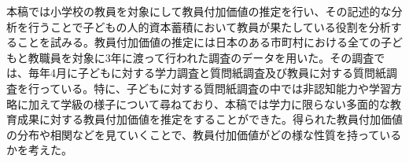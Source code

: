\documentclass[a4paper,12pt]{article}
\begin{document}
本稿では小学校の教員を対象にして教員付加価値の推定を行い、その記述的な分析を行うことで子どもの人的資本蓄積において教員が果たしている役割を分析することを試みる。教員付加価値の推定には日本のある市町村における全ての子どもと教職員を対象に3年に渡って行われた調査のデータを用いた。その調査では、毎年4月に子どもに対する学力調査と質問紙調査及び教員に対する質問紙調査を行っている。特に、子どもに対する質問紙調査の中では非認知能力や学習方略に加えて学級の様子について尋ねており、本稿では学力に限らない多面的な教育成果に対する教員付加価値を推定をすることができた。得られた教員付加価値の分布や相関などを見ていくことで、教員付加価値がどの様な性質を持っているかを考えた。
\end{document}
